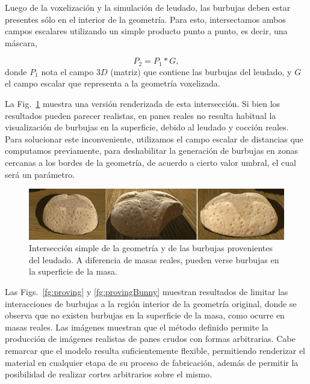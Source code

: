 Luego de la voxelización y la simulación de leudado, las burbujas deben estar presentes sólo en el interior de la geometría.
Para esto, intersectamos ambos campos escalares utilizando un simple producto punto a punto, es decir, una máscara,

\begin{equation*}
P_{2} = P_{1} * G,
\end{equation*}
%
donde $P_{1}$ nota el campo $3D$ (matriz) que contiene las burbujas del leudado, y $G$ el campo escalar que representa a la geometría voxelizada.

La Fig.~\ref{fg:intersectProblem} muestra una versión renderizada de esta intersección.
Si bien los resultados pueden parecer realistas, en panes reales no resulta habitual la visualización de burbujas en la superficie, debido al leudado y cocción reales.
Para solucionar este inconveniente, utilizamos el campo escalar de distancias que computamos previamente, para deshabilitar la generación de burbujas en zonas cercanas a los bordes de la geometría, de acuerdo a cierto valor umbral, el cual será un parámetro.


\begin{figure}
\includegraphics[width=13cm]{figures/intersectProblem}
\caption[Intersección simple de la geometría y de las burbujas provenientes del leudado]{Intersección simple de la geometría y de las burbujas provenientes del leudado. A diferencia de masas reales, pueden verse burbujas en la superficie de la masa.}
\label{fg:intersectProblem}
\end{figure}


Las Figs.~\ref{fg:proving} y \ref{fg:provingBunny} muestran resultados de limitar las interacciones de burbujas a la región interior de la geometría original, donde se observa que no existen burbujas en la superficie de la masa, como ocurre en masas reales.
Las imágenes muestran que el método definido permite la producción de imágenes realistas de panes crudos con formas arbitrarias.
Cabe remarcar que el modelo resulta suficientemente flexible, permitiendo renderizar el material en cualquier etapa de su proceso de fabricación, además de permitir la posibilidad de realizar cortes arbitrarios sobre el mismo.


